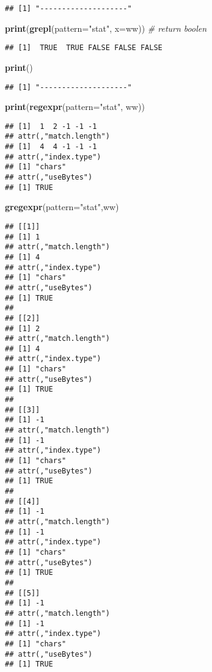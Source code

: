 \documentclass[
]{article}
\newenvironment{Shaded}{\begin{snugshade}}{\end{snugshade}}
\newcommand{\AttributeTok}[1]{\textcolor[rgb]{0.13,0.29,0.53}{#1}}
\newcommand{\CommentTok}[1]{\textcolor[rgb]{0.56,0.35,0.01}{\textit{#1}}}
\newcommand{\FunctionTok}[1]{\textcolor[rgb]{0.13,0.29,0.53}{\textbf{#1}}}
\newcommand{\NormalTok}[1]{#1}
\newcommand{\StringTok}[1]{\textcolor[rgb]{0.31,0.60,0.02}{#1}}
\begin{document}
\begin{verbatim}
## [1] "--------------------"
\end{verbatim}

\begin{Shaded}
\begin{Highlighting}[]
\FunctionTok{print}\NormalTok{(}\FunctionTok{grepl}\NormalTok{(}\AttributeTok{pattern=}\StringTok{"stat"}\NormalTok{, }\AttributeTok{x=}\NormalTok{ww)) }\CommentTok{\# return boolen}
\end{Highlighting}
\end{Shaded}

\begin{verbatim}
## [1]  TRUE  TRUE FALSE FALSE FALSE
\end{verbatim}

\begin{Shaded}
\begin{Highlighting}[]
\FunctionTok{print}\NormalTok{(}\StringTok{\textquotesingle{}{-}{-}{-}{-}{-}{-}{-}{-}{-}{-}{-}{-}{-}{-}{-}{-}{-}{-}{-}{-}\textquotesingle{}}\NormalTok{)}
\end{Highlighting}
\end{Shaded}

\begin{verbatim}
## [1] "--------------------"
\end{verbatim}

\begin{Shaded}
\begin{Highlighting}[]
\FunctionTok{print}\NormalTok{(}\FunctionTok{regexpr}\NormalTok{(}\AttributeTok{pattern=}\StringTok{"stat"}\NormalTok{, ww))}
\end{Highlighting}
\end{Shaded}

\begin{verbatim}
## [1]  1  2 -1 -1 -1
## attr(,"match.length")
## [1]  4  4 -1 -1 -1
## attr(,"index.type")
## [1] "chars"
## attr(,"useBytes")
## [1] TRUE
\end{verbatim}

\begin{Shaded}
\begin{Highlighting}[]
\FunctionTok{gregexpr}\NormalTok{(}\AttributeTok{pattern=}\StringTok{"stat"}\NormalTok{,ww)}
\end{Highlighting}
\end{Shaded}

\begin{verbatim}
## [[1]]
## [1] 1
## attr(,"match.length")
## [1] 4
## attr(,"index.type")
## [1] "chars"
## attr(,"useBytes")
## [1] TRUE
## 
## [[2]]
## [1] 2
## attr(,"match.length")
## [1] 4
## attr(,"index.type")
## [1] "chars"
## attr(,"useBytes")
## [1] TRUE
## 
## [[3]]
## [1] -1
## attr(,"match.length")
## [1] -1
## attr(,"index.type")
## [1] "chars"
## attr(,"useBytes")
## [1] TRUE
## 
## [[4]]
## [1] -1
## attr(,"match.length")
## [1] -1
## attr(,"index.type")
## [1] "chars"
## attr(,"useBytes")
## [1] TRUE
## 
## [[5]]
## [1] -1
## attr(,"match.length")
## [1] -1
## attr(,"index.type")
## [1] "chars"
## attr(,"useBytes")
## [1] TRUE
\end{verbatim}
\end{document}
